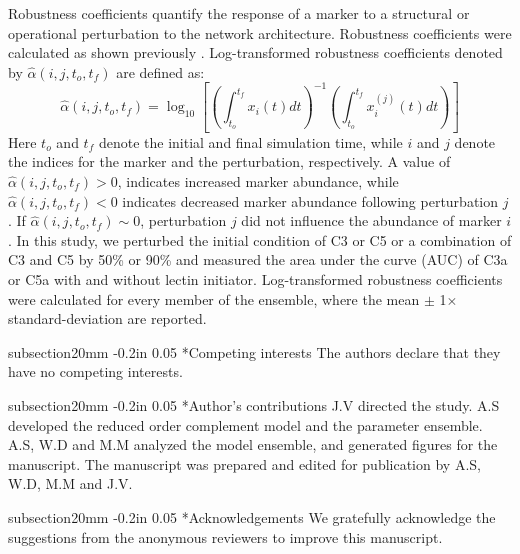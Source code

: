 \documentclass[12pt]{article}
\makeatletter
\renewcommand\section{\@startsection
	{subsection}{2}{0mm}
	{-0.2in}
	{0.05\baselineskip}
	{\normalfont\large\bfseries}}
\makeatother
\begin{document}
Robustness coefficients quantify the response of a marker to a structural or operational perturbation to the network architecture.
Robustness coefficients were calculated as shown previously \cite{Tasseff:2011aa}.
Log-transformed robustness coefficients denoted by $\hat{\alpha}\left(i,j,t_{o},t_{f}\right)$ are defined as:
\begin{equation}
\hat{\alpha}\left(i,j,t_{o},t_{f}\right)=\log_{10}\left[\left(\displaystyle\int_{t_{o}}^{t_{f}}x_{i}\left(t\right)dt\right)^{-1}\left(\displaystyle\int_{t_{o}}^{t_{f}}x^{(j)}_{i}\left(t\right)dt\right)\right]
\end{equation}
Here $t_o$ and $t_f$ denote the initial and final simulation time, while $i$ and $j$ denote the indices for the marker and the perturbation, respectively.
A value of $\hat{\alpha}\left(i,j,t_{o},t_{f}\right)>0$, indicates increased marker abundance, while $\hat{\alpha}\left(i,j,t_{o},t_{f}\right)<0$ indicates decreased marker abundance following perturbation $j$. If $\hat{\alpha}\left(i,j,t_{o},t_{f}\right)\sim{0}$, perturbation $j$ did not influence the abundance of marker $i$.
In this study, we perturbed the initial condition of C3 or C5 or a combination of C3 and C5 by 50\% or 90\% and measured the area under the curve (AUC)
of C3a or C5a with and without lectin initiator.
Log-transformed robustness coefficients were calculated for every member of the ensemble, where the mean $\pm$ 1$\times$standard-deviation are reported.


\clearpage

\section*{Competing interests}
The authors declare that they have no competing interests.

\section*{Author's contributions}
J.V directed the study. A.S developed the reduced order complement model and the parameter ensemble.
A.S, W.D and M.M analyzed the model ensemble, and generated figures for the manuscript.
The manuscript was prepared and edited for publication by A.S, W.D, M.M and J.V.

\section*{Acknowledgements}
We gratefully acknowledge the suggestions from the anonymous reviewers to improve this manuscript.
\end{document}
